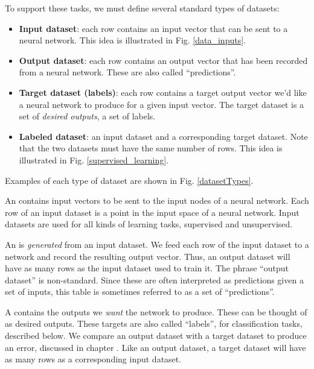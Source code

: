 To support these tasks, we must define several standard types of datasets:
\begin{itemize}
\item \textbf{Input dataset}: each row contains an input vector that can be sent to a neural network. This idea is illustrated in Fig. \ref{data_inputs}.
\item \textbf{Output dataset}: each row contains an output vector that has been recorded from a neural network. These are also called ``predictions''. 
\item \textbf{Target dataset (labels)}: each row contains a target output vector we'd like a neural network to produce for a given input vector. The target dataset is a set of \emph{desired outputs}, a set of labels.
\item \textbf{Labeled dataset}: an input dataset and a corresponding target dataset. Note that the two datasets must have the same number of rows. This idea is illustrated in Fig. \ref{supervised_learning}.
\end{itemize}
Examples of each type of dataset are shown in Fig. \ref{datasetTypes}.


An  contains input vectors to be sent to the input nodes of a neural network. Each row of an input dataset is a point in the input space of a neural network. Input datasets are used for all kinds of learning tasks, supervised and unsupervised. 

An  is \emph{generated} from an input dataset. We feed each row of the input dataset to a network and record the resulting output vector. Thus, an output dataset will have as many rows as the input dataset used to train it. The phrase ``output dataset'' is non-standard. Since these are often interpreted as predictions given a set of inputs, this table is sometimes referred to as a set  of ``predictions''. 

A  contains the outputs we \emph{want} the network to produce. These can be thought of as desired outputs. These targets are also called ``labels'', for classification tasks, described below. We compare an output dataset with a target dataset to produce an error, discussed in chapter . Like an output dataset, a target dataset will have as many rows as a corresponding input dataset. 

